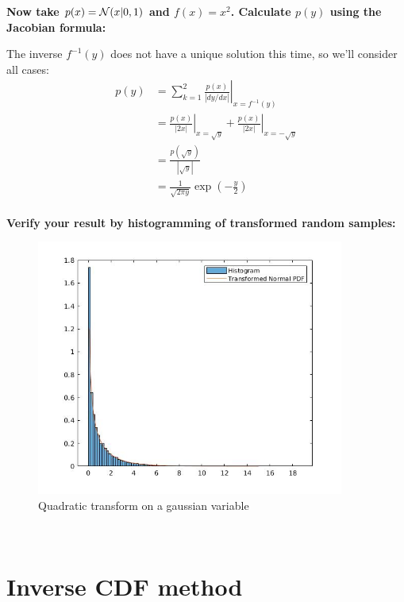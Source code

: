 \documentclass[12pt]{article}
\begin{document}
\pagebreak
{\bf Now take $p(x)={\cal N}(x|0,1)$ and $f(x)=x^2$. Calculate $p(y)$ using the Jacobian formula:}
\par\bigskip
{\textsf The inverse $f^{-1}(y)$ does not have a unique solution this time, so we'll consider all cases:\\
\begin{equation*}
\begin{split}
  p(y) & = \sum_{k=1}^2{\left.\frac{p(x)}{|dy/dx|}\right|_{x=f^{-1}(y)}} \\
       & = \left.\frac{p(x)}{|2x|}\right|_{x=\sqrt{y}}+\left.\frac{p(x)}{|2x|}\right|_{x=-\sqrt{y}} \\
       & = \frac{p(\sqrt{y})}{|\sqrt{y}|}\\
       & = \frac{1}{\sqrt{2\pi y}}\exp{(-\frac{y}{2})}
\end{split}
\end{equation*}
}
\\
{\bf Verify your result by histogramming of transformed random samples:}
\\
\begin{figure}[h]
\includegraphics[width=0.9\textwidth]{norm-parabo-y.jpg}
  \caption{Quadratic transform on a gaussian variable}
  \label{fig:Quadratic transform on a gaussian variable}
\end{figure}\\
\pagebreak
\section{\bf Inverse CDF method} 
\end{document}
